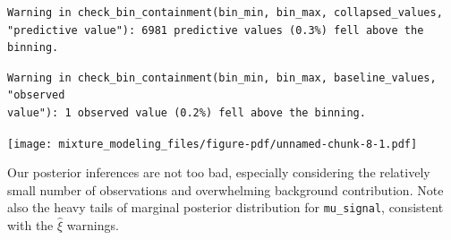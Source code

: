 \documentclass[
  letterpaper,
  DIV=11,
  numbers=noendperiod]{scrartcl}
\begin{document}
\begin{verbatim}
Warning in check_bin_containment(bin_min, bin_max, collapsed_values,
"predictive value"): 6981 predictive values (0.3%) fell above the binning.
\end{verbatim}

\begin{verbatim}
Warning in check_bin_containment(bin_min, bin_max, baseline_values, "observed
value"): 1 observed value (0.2%) fell above the binning.
\end{verbatim}

\texttt{[image: mixture\_modeling\_files/figure-pdf/unnamed-chunk-8-1.pdf]}

Our posterior inferences are not too bad, especially considering the
relatively small number of observations and overwhelming background
contribution. Note also the heavy tails of marginal posterior
distribution for \texttt{mu\_signal}, consistent with the \(\hat{\xi}\)
warnings.
\end{document}

